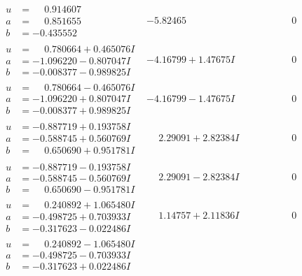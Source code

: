\documentclass[1p]{elsarticle_modified}
\theoremstyle{definition}
\begin{document}
$$\begin{array}{c|c|c}
\begin{aligned}
u &= \phantom{-}0.914607\phantom{ +0.000000I} \\
a &= \phantom{-}0.851655\phantom{ +0.000000I} \\
b &= -0.435552\phantom{ +0.000000I}\end{aligned}
 & -5.82465\phantom{ +0.000000I} & \phantom{-0.000000 } 0 \\ \hline\begin{aligned}
u &= \phantom{-}0.780664 + 0.465076 I \\
a &= -1.096220 - 0.807047 I \\
b &= -0.008377 - 0.989825 I\end{aligned}
 & -4.16799 + 1.47675 I & \phantom{-0.000000 } 0 \\ \hline\begin{aligned}
u &= \phantom{-}0.780664 - 0.465076 I \\
a &= -1.096220 + 0.807047 I \\
b &= -0.008377 + 0.989825 I\end{aligned}
 & -4.16799 - 1.47675 I & \phantom{-0.000000 } 0 \\ \hline\begin{aligned}
u &= -0.887719 + 0.193758 I \\
a &= -0.588745 + 0.560769 I \\
b &= \phantom{-}0.650690 + 0.951781 I\end{aligned}
 & \phantom{-}2.29091 + 2.82384 I & \phantom{-0.000000 } 0 \\ \hline\begin{aligned}
u &= -0.887719 - 0.193758 I \\
a &= -0.588745 - 0.560769 I \\
b &= \phantom{-}0.650690 - 0.951781 I\end{aligned}
 & \phantom{-}2.29091 - 2.82384 I & \phantom{-0.000000 } 0 \\ \hline\begin{aligned}
u &= \phantom{-}0.240892 + 1.065480 I \\
a &= -0.498725 + 0.703933 I \\
b &= -0.317623 - 0.022486 I\end{aligned}
 & \phantom{-}1.14757 + 2.11836 I & \phantom{-0.000000 } 0 \\ \hline\begin{aligned}
u &= \phantom{-}0.240892 - 1.065480 I \\
a &= -0.498725 - 0.703933 I \\
b &= -0.317623 + 0.022486 I\end{aligned}

\end{array}$$
\end{document}
